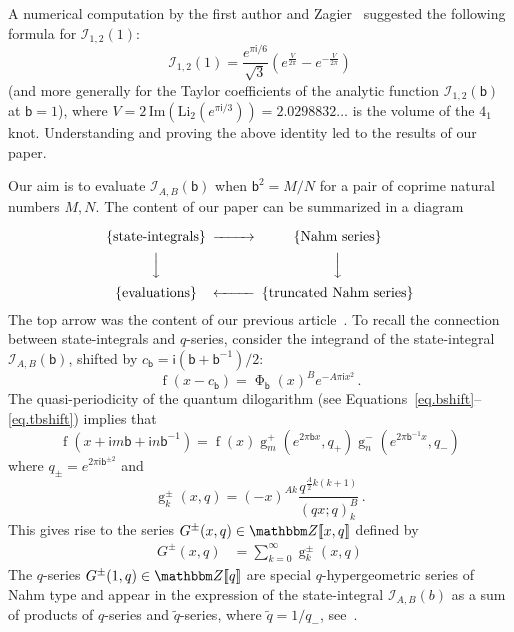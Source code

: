 \documentclass[12pt]{amsart}
\theoremstyle{definition}
\def\BZ{\mathbbm Z}
\def\calI{\mathcal I}
\def\tq{\tilde{q}}
\def\Li{\mathrm{Li}}
\newcommand{\im}{\mathsf{i}}
\newcommand{\fad}[1]{\operatorname{\Phi}_{#1}}
\begin{document}
A numerical computation by the first author and Zagier~\cite{GZ2}
suggested the following formula for $\calI_{1,2}(1)$:
\begin{equation}
\label{eq.I211}
\calI_{1,2}(1)= \frac{e^{\pi\im/6}}{\sqrt{3}}
\left(e^{\frac{V}{2\pi}}-e^{-\frac{V}{2\pi}}\right)
\end{equation}
(and more generally for the Taylor coefficients of the analytic function 
$\calI_{1,2}(\mathsf{b})$ at $\mathsf{b}=1$), 
where $V=2\,\mathrm{Im}(\Li_2(e^{\pi \im/3}))=2.0298832\ldots$ is the 
volume of the $4_1$ knot. Understanding and proving the above identity led 
to the results of our paper. 

Our aim is to evaluate $\calI_{A,B}(\mathsf{b})$ when 
$\mathsf{b}^2=M/N$ for a pair of coprime natural numbers $M,N$. 
The content of our paper can be summarized in a diagram

$$
\begin{CD}
\{\text{state-integrals}\} @>>> \{\text{Nahm series}\} \\
@VVV                              @VVV   \\
\{\text{evaluations}\} @<<< \{\text{truncated Nahm series}\}
\end{CD}
$$
The top arrow was the content of our previous article~\cite{state-integrals}.
To recall the connection between state-integrals and $q$-series,
consider the integrand of the state-integral $\calI_{A,B}(\mathsf{b})$, 
shifted by $c_{\mathsf{b}}=\im (\mathsf{b}+\mathsf{b}^{-1})/2$:
\begin{equation}
\label{eq.fc}
\operatorname{f}(x-c_{\mathsf{b}})= \fad{\mathsf{b}}(x)^B e^{-A \pi \im x^2} \,.
\end{equation}
The quasi-periodicity of the quantum dilogarithm (see 
Equations~\eqref{eq.bshift}--\eqref{eq.tbshift}) implies that
$$
\operatorname{f}(x+ \im m \mathsf{b} + \im n \mathsf{b}^{-1})=
\operatorname{f}(x) \operatorname{g}^+_m(e^{2 \pi \mathsf{b} x},q_+) 
\operatorname{g}^-_n(e^{2 \pi \mathsf{b}^{-1} x},q_-)
$$
where $q_\pm=e^{2 \pi \im \mathsf{b}^{\pm 2}}$ and
\begin{equation}
\label{eq.gpm}
\operatorname{g}^\pm_k(x,q)= (-x)^{A k}\frac{q^{\frac{A}{2}k(k+1)}}{(qx;q)_k^B} \,.
\end{equation}
This gives rise to the series $G^\pm(x,q) \in \BZ[\![x,q]\!]$ 
defined by
\begin{align}
G^\pm(x,q)&=\sum_{k=0}^\infty \operatorname{g}^\pm_k(x,q) 
\end{align}
The $q$-series $G^{\pm}(1,q) \in \BZ[\![q]\!]$ are special $q$-hypergeometric
series of Nahm type and appear in the expression of the 
state-integral $\calI_{A,B}(b)$ as a sum of products of $q$-series and 
$\tq$-series, where $\tq=1/q_-$, see~\cite[Thm.1.1]{state-integrals}.
\end{document}
